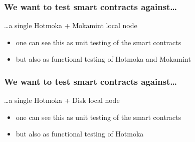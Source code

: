 \documentclass[11pt]{beamer}  %
\begin{document}
\begin{frame}\frametitle{We want to test smart contracts against\ldots}

  \begin{center}
    {\color{red}\ldots a single Hotmoka + Mokamint local node}
  \end{center}

  \begin{center}
  \end{center}

  \begin{itemize}
  \item one can see this as unit testing of the smart contracts
  \item but also as functional testing of Hotmoka and Mokamint
  \end{itemize}

\end{frame}

\begin{frame}\frametitle{We want to test smart contracts against\ldots}

  \begin{center}
    {\color{red}\ldots a single Hotmoka + Disk local node}
  \end{center}

  \begin{center}
  \end{center}

  \begin{itemize}
  \item one can see this as unit testing of the smart contracts
  \item but also as functional testing of Hotmoka
  \end{itemize}

\end{frame}
\end{document}
